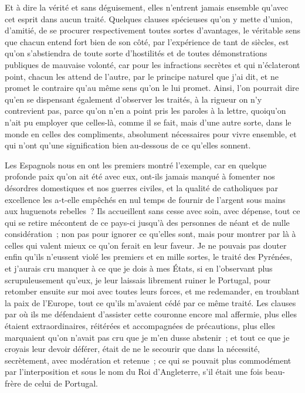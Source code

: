 \documentclass[french,twoside]{book} %
\begin{document}
Et à dire la vérité et sans déguisement, elles n’entrent jamais ensemble qu’avec cet esprit dans aucun traité. Quelques clauses spécieuses qu’on y mette d’union, d’amitié, de se procurer respectivement toutes sortes d’avantages, le véritable sens que chacun entend fort bien de son côté, par l’expérience de tant de siècles, est qu’on s’abstiendra de toute sorte d’hostilités et de toutes démonstrations publiques de mauvaise volonté, car pour les infractions secrètes et qui n’éclateront point, chacun les attend de l’autre, par le principe naturel que j’ai dit, et ne promet le contraire qu’au même sens qu’on le lui promet. Ainsi, l’on pourrait dire qu’en se dispensant également d’observer les traités, à la rigueur on n’y contrevient pas, parce qu’on n’en a point pris les paroles à la lettre, quoiqu’on n’ait pu employer que celles-là, comme il se fait, mais d’une autre sorte, dans le monde en celles des compliments, absolument nécessaires pour vivre ensemble, et qui n’ont qu’une signification bien au-dessous de ce qu’elles sonnent.\par
Les Espagnols nous en ont les premiers montré l’exemple, car en quelque profonde paix qu’on ait été avec eux, ont-ils jamais manqué à fomenter nos désordres domestiques et nos guerres civiles, et la qualité de catholiques par excellence les a-t-elle empêchés en nul temps de fournir de l’argent sous mains aux huguenots rebelles ? Ils accueillent sans cesse avec soin, avec dépense, tout ce qui se retire mécontent de ce pays-ci jusqu’à des personnes de néant et de nulle considération ; non pas pour ignorer ce qu’elles sont, mais pour montrer par là à celles qui valent mieux ce qu’on ferait en leur faveur. Je ne pouvais pas douter enfin qu’ils n’eussent violé les premiers et en mille sortes, le traité des Pyrénées, et j’aurais cru manquer à ce que je dois à mes États, si en l’observant plus scrupuleusement qu’eux, je leur laissais librement ruiner le Portugal, pour retomber ensuite sur moi avec toutes leurs forces, et me redemander, en troublant la paix de l’Europe, tout ce qu’ils m’avaient cédé par ce même traité. Les clauses par où ils me défendaient d’assister cette couronne encore mal affermie, plus elles étaient extraordinaires, réitérées et accompagnées de précautions, plus elles marquaient qu’on n’avait pas cru que je m’en dusse abstenir ; et tout ce que je croyais leur devoir déférer, était de ne le secourir que dans la nécessité, secrètement, avec modération et retenue ; ce qui se pouvait plus commodément par l’interposition et sous le nom du Roi d’Angleterre, s’il était une fois beau-frère de celui de Portugal.\par
\end{document}
